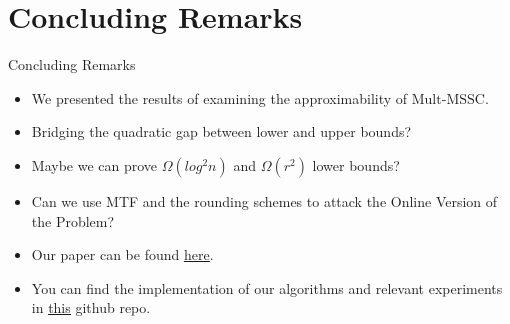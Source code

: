 \documentclass{beamer}
\def\DSSC{\mathrm{Mult}\text{-}\mathrm{MSSC}}
\begin{document}
\section{Concluding Remarks}

\begin{frame}{Concluding Remarks}
    \begin{itemize}
         \item We presented the results of \cite{fotakis_et_al:LIPIcs.ICALP.2021.65} examining the approximability of $\DSSC$.
         \item Bridging the quadratic gap between lower and upper bounds?
         \item Maybe we can prove $\Omega(log^2n)$ and $\Omega(r^2)$ lower bounds?
         \item Can we use MTF and the rounding schemes to attack the Online Version of the Problem?
         \item Our paper can be found \underline{\href{https://drops.dagstuhl.de/opus/volltexte/2021/14134/}{here}}.
         \item You can find the implementation of our algorithms and relevant experiments in \href{https://github.com/infinity4471/Dynamic-Min-Sum-Set-Cover}{\underline{this}} github repo.
    \end{itemize}
\end{frame}

\end{document}
